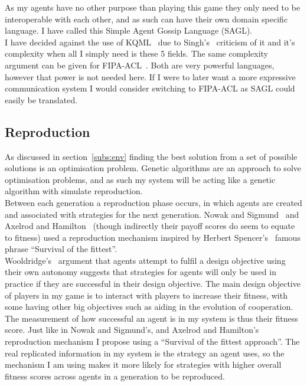 \documentclass[]{final_report}
\begin{document}
As my agents have no other purpose than playing this game they only need to be interoperable with each other, and as such can have their own domain specific language. I have called this Simple Agent Gossip Language (SAGL).\\
I have decided against the use of KQML~\cite{finin1994kqml} due to Singh's~\cite{singh1998agent} criticism of it and it's complexity when all I simply need is these 5 fields. The same complexity argument can be given for FIPA-ACL~\cite{o1998fipa}. Both are very powerful languages, however that power is not needed here. If I were to later want a more expressive communication system I would consider switching to FIPA-ACL as SAGL could easily be translated.


\subsection{Reproduction}
\label{subs:reproduction}
As discussed in section~\ref{subs:env} finding the best solution from a set of possible solutions is an optimisation problem. Genetic algorithms are an approach to solve optimisation problems, and as such my system will be acting like a genetic algorithm with simulate reproduction.\\
Between each generation a reproduction phase occurs, in which agents are created and associated with strategies for the next generation. Nowak and Sigmund~\cite{evol_indirect_image} and Axelrod and Hamilton~\cite{evolution_of_cooperation} (though indirectly their payoff scores do seem to equate to fitness) used a reproduction mechanism inspired by Herbert Spencer's~\cite{spencer1864principles} famous phrase ``Survival of the fittest''.\\
Wooldridge's~\cite{wooldridge2009introduction} argument that agents attempt to fulfil a design objective using their own autonomy suggests that strategies for agents will only be used in practice if they are successful in their design objective. The main design objective of players in my game is to interact with players to increase their fitness, with some having other big objectives such as aiding in the evolution of cooperation.\\
The measurement of how successful an agent is in my system is thus their fitness score. Just like in Nowak and Sigmund's, and Axelrod and Hamilton's reproduction mechanism I propose using a ``Survival of the fittest approach''. The real replicated information in my system is the strategy an agent uses, so the mechanism I am using makes it more likely for strategies with higher overall fitness scores across agents in a generation to be reproduced.\\
\end{document}

